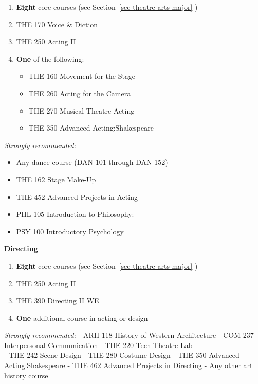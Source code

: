 \documentclass[
  letterpaper,
]{scrbook}
\providecommand{\tightlist}{%
  \setlength{\itemsep}{0pt}\setlength{\parskip}{0pt}}
\begin{document}
\begin{enumerate}
\def\labelenumi{\arabic{enumi}.}
\item
  \textbf{Eight} core courses (see Section~\ref{sec-theatre-arts-major}
  )
\item
  THE 170 Voice \& Diction
\item
  THE 250 Acting II
\item
  \textbf{One} of the following:

  \begin{itemize}
  \tightlist
  \item
    THE 160 Movement for the Stage
  \item
    THE 260 Acting for the Camera
  \item
    THE 270 Musical Theatre Acting
  \item
    THE 350 Advanced Acting:Shakespeare
  \end{itemize}
\end{enumerate}

\emph{Strongly recommended:}

\begin{itemize}
\tightlist
\item
  Any dance course (DAN-101 through DAN-152)
\item
  THE 162 Stage Make-Up
\item
  THE 452 Advanced Projects in Acting
\item
  PHL 105 Introduction to Philosophy:
\item
  PSY 100 Introductory Psychology
\end{itemize}

\textbf{Directing}

\begin{enumerate}
\def\labelenumi{\arabic{enumi}.}
\item
  \textbf{Eight} core courses (see Section~\ref{sec-theatre-arts-major}
  )
\item
  THE 250 Acting II
\item
  THE 390 Directing II WE
\item
  \textbf{One} additional course in acting or design
\end{enumerate}

\emph{Strongly recommended:} - ARH 118 History of Western Architecture -
COM 237 Interpersonal Communication - THE 220 Tech Theatre Lab\\
- THE 242 Scene Design - THE 280 Costume Design - THE 350 Advanced
Acting:Shakespeare - THE 462 Advanced Projects in Directing - Any other
art history course
\end{document}
